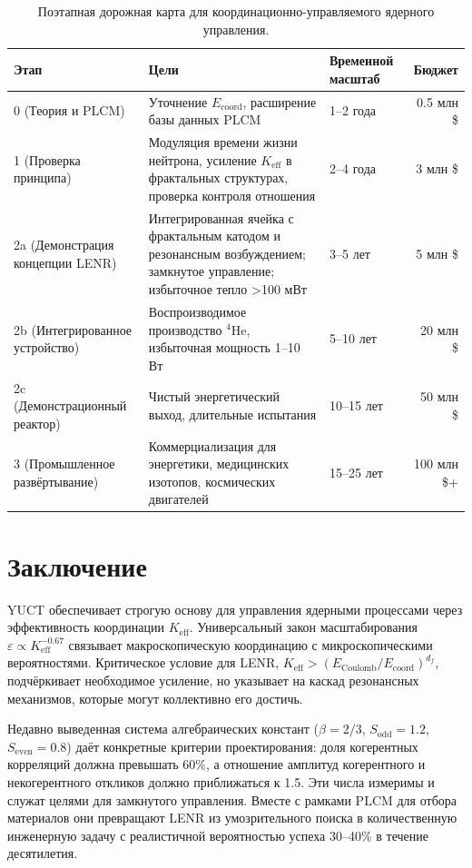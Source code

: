 \documentclass[12pt]{article}
\theoremstyle{remark}
\newcommand{\Keff}{K_{\mathrm{eff}}}
\newcommand{\df}{d_{\!f}}
\newcommand{\Sodd}{S_{\mathrm{odd}}}
\newcommand{\Seven}{S_{\mathrm{even}}}
\begin{document}
	\begin{table}[htbp]
		\centering
		\caption{Поэтапная дорожная карта для координационно-управляемого ядерного управления.}
		\label{tab:roadmap}
		\small
		\begin{tabular}{l p{5cm} l r}
			\toprule
			\textbf{Этап} & \textbf{Цели} & \textbf{Временной масштаб} & \textbf{Бюджет} \\
			\midrule
			0 (Теория и PLCM) & Уточнение \(E_{\mathrm{coord}}\), расширение базы данных PLCM & 1–2 года & 0.5 млн \$ \\
			1 (Проверка принципа) & Модуляция времени жизни нейтрона, усиление \(\Keff\) в фрактальных структурах, проверка контроля отношения & 2–4 года & 3 млн \$ \\
			2a (Демонстрация концепции LENR) & Интегрированная ячейка с фрактальным катодом и резонансным возбуждением; замкнутое управление; избыточное тепло >100 мВт & 3–5 лет & 5 млн \$ \\
			2b (Интегрированное устройство) & Воспроизводимое производство \(^4\)He, избыточная мощность 1–10 Вт & 5–10 лет & 20 млн \$ \\
			2c (Демонстрационный реактор) & Чистый энергетический выход, длительные испытания & 10–15 лет & 50 млн \$ \\
			3 (Промышленное развёртывание) & Коммерциализация для энергетики, медицинских изотопов, космических двигателей & 15–25 лет & 100 млн \$+ \\
			\bottomrule
		\end{tabular}
	\end{table}
	
	\section{Заключение}
	\label{sec:conclusion}
	
	YUCT обеспечивает строгую основу для управления ядерными процессами через эффективность координации \(\Keff\). Универсальный закон масштабирования \(\varepsilon \propto \Keff^{-0.67}\) связывает макроскопическую координацию с микроскопическими вероятностями. Критическое условие для LENR, \(\Keff > (E_{\text{Coulomb}}/E_{\mathrm{coord}})^{\df}\), подчёркивает необходимое усиление, но указывает на каскад резонансных механизмов, которые могут коллективно его достичь.
	
	Недавно выведенная система алгебраических констант (\(\beta=2/3\), \(\Sodd=1.2\), \(\Seven=0.8\)) даёт конкретные критерии проектирования: доля когерентных корреляций должна превышать 60\%, а отношение амплитуд когерентного и некогерентного откликов должно приближаться к 1.5. Эти числа измеримы и служат целями для замкнутого управления. Вместе с рамками PLCM для отбора материалов они превращают LENR из умозрительного поиска в количественную инженерную задачу с реалистичной вероятностью успеха 30–40\% в течение десятилетия.
	
\end{document}
